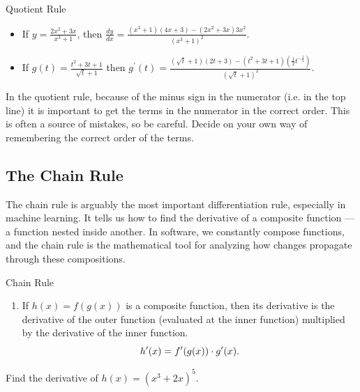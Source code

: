 \begin{example} Quotient Rule

    \begin{itemize}
        \item If \(y=\frac{2 x^2+3 x}{x^3+1}\), then \(\frac{d y}{d x}=\frac{\left(x^3+1\right)(4 x+3)-\left(2 x^2+3 x\right) 3 x^2}{\left(x^3+1\right)^2}\). \vspace{0.5em}   
        \item If \(g(t)=\frac{t^2+3 t+1}{\sqrt{t}+1}\) then \(g^{\prime}(t)=\frac{(\sqrt{t}+1)(2 t+3)-\left(t^2+3 t+1\right)\left(\frac{1}{2} t^{-\frac{1}{2}}\right)}{(\sqrt{t}+1)^2}\). \vspace{0.5em}
    \end{itemize}
\end{example}

In the quotient rule, because of the minus sign in the numerator (i.e. in the top line) it is important to get the terms in the numerator in the correct order. This is often a source of mistakes, so be careful. Decide on your own way of remembering the correct order of the terms.


\subsection*{The Chain Rule}
The chain rule is arguably the most important differentiation rule, especially in machine learning. It tells us how to find the derivative of a composite function — a function nested inside another. In software, we constantly compose functions, and the chain rule is the mathematical tool for analyzing how changes propagate through these compositions.

\begin{theorem}{Chain Rule}
    \vspace{0.5em}
    \setcounter{enumi}{6}
    \begin{enumerate}
        \item If \( h(x) = f(g(x)) \) is a composite function, then its derivative is the derivative of the outer function (evaluated at the inner function) multiplied by the derivative of the inner function. \vspace{0.5em}
        \[
        h'(x) = f'(g(x)) \cdot g'(x). \vspace{0.5em}
        \]
    \end{enumerate}
\end{theorem}

\begin{example}

Find the derivative of \( h(x) = (x^3 + 2x)^5 \).
\end{example}

